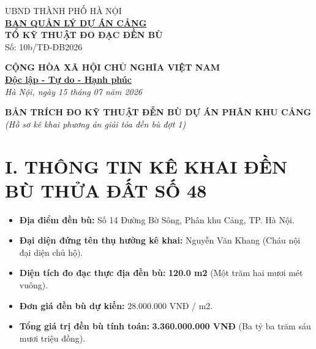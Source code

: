 \documentclass[12pt,a4paper]{article}
\begin{document}
\noindent
\begin{minipage}[t]{0.5\textwidth}
    \begin{center}
        \small
        UBND THÀNH PHỐ HÀ NỘI\\
        \textbf{\underline{BAN QUẢN LÝ DỰ ÁN CẢNG}}\\[0.1cm]
        \textbf{TỔ KỸ THUẬT ĐO ĐẠC ĐỀN BÙ}\\
        Số: 10b/TĐ-ĐB2026
    \end{center}
\end{minipage}
\hfill
\begin{minipage}[t]{0.48\textwidth}
    \begin{center}
        \small
        \textbf{CỘNG HÒA XÃ HỘI CHỦ NGHĨA VIỆT NAM}\\
        \textbf{\underline{Độc lập - Tự do - Hạnh phúc}}\\[0.1cm]
        \textit{Hà Nội, ngày 15 tháng 07 năm 2026}
    \end{center}
\end{minipage}

\vspace{0.6cm}

\begin{center}
    \textbf{\large BẢN TRÍCH ĐO KỸ THUẬT ĐỄN BÙ DỰ ÁN PHÂN KHU CẢNG}\\
    \textit{(Hồ sơ kê khai phương án giải tỏa đền bù đợt 1)}
\end{center}

\vspace{0.3cm}

\section*{I. THÔNG TIN KÊ KHAI ĐỀN BÙ THỬA ĐẤT SỐ 48}
\begin{itemize}[leftmargin=1.5cm]
    \item \textbf{Địa điểm đền bù:} Số 14 Đường Bờ Sông, Phân khu Cảng, TP. Hà Nội.
    \item \textbf{Đại diện đứng tên thụ hưởng kê khai:} Nguyễn Văn Khang (Cháu nội đại diện chủ hộ).
    \item \textbf{Diện tích đo đạc thực địa đền bù:} \textbf{120.0 m2} (Một trăm hai mươi mét vuông).
    \item \textbf{Đơn giá đền bù dự kiến:} 28.000.000 VNĐ / m2.
    \item \textbf{Tổng giá trị đền bù tính toán:} \textbf{3.360.000.000 VNĐ} (Ba tỷ ba trăm sáu mươi triệu đồng).
\end{itemize}
\end{document}
